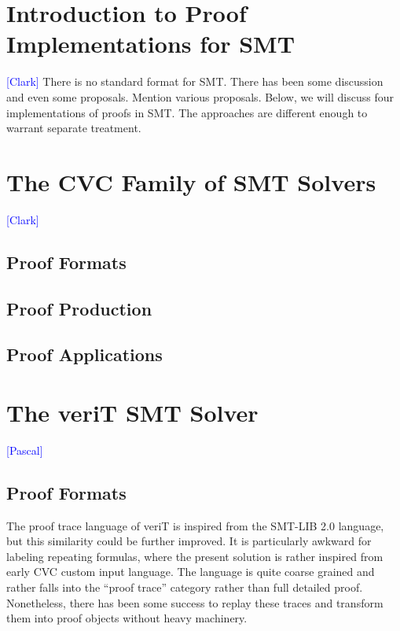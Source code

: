 \documentclass{llncs}
\newcommand{\Note}[1]{\textcolor{blue}{[#1]}}
\begin{document}


\section{Introduction to Proof Implementations for SMT}

\Note{Clark}
There is no standard format for SMT.  There has been some discussion and even
some proposals.  Mention various proposals.  Below, we will discuss four
implementations of proofs in SMT.  The approaches are different enough to
warrant separate treatment.

\section{The CVC Family of SMT Solvers}
\Note{Clark}
\subsection{Proof Formats}
\subsection{Proof Production}
\subsection{Proof Applications}

\section{The veriT SMT Solver}
\Note{Pascal}
\subsection{Proof Formats}

The proof trace language of veriT is inspired from the SMT-LIB 2.0 language, but this similarity could be further improved.  It is particularly awkward for labeling repeating formulas, where the present solution is rather inspired from early CVC custom input language.  The language is quite coarse grained and rather falls into the ``proof trace'' category rather than full detailed proof.  Nonetheless, there has been some success to replay these traces and transform them into proof objects without heavy machinery.
\end{document}
